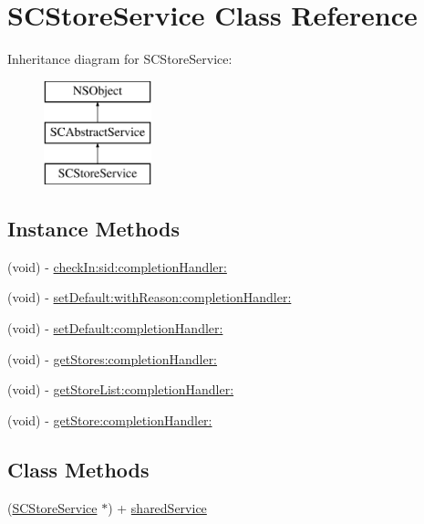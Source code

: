 \hypertarget{interface_s_c_store_service}{}\section{S\+C\+Store\+Service Class Reference}
\label{interface_s_c_store_service}
Inheritance diagram for S\+C\+Store\+Service\+:\begin{figure}[H]
\begin{center}
\leavevmode
\includegraphics[height=3.000000cm]{interface_s_c_store_service}
\end{center}
\end{figure}
\subsection*{Instance Methods}
\begin{DoxyCompactItemize}
\item 
(void) -\/ \hyperlink{interface_s_c_store_service_a6f5fcead65e857a0b706065e2ff3c822}{check\+In\+:sid\+:completion\+Handler\+:}
\item 
(void) -\/ \hyperlink{interface_s_c_store_service_a6961eb23220b17dd36f6a10e68032e41}{set\+Default\+:with\+Reason\+:completion\+Handler\+:}
\item 
(void) -\/ \hyperlink{interface_s_c_store_service_aac981e3e6158ccff5440cfe9d615831c}{set\+Default\+:completion\+Handler\+:}
\item 
(void) -\/ \hyperlink{interface_s_c_store_service_a7187d37ca52fa9c207580e7745e00b94}{get\+Stores\+:completion\+Handler\+:}
\item 
(void) -\/ \hyperlink{interface_s_c_store_service_a7901fdb6ddd8ed450c9e707f566aee2f}{get\+Store\+List\+:completion\+Handler\+:}
\item 
(void) -\/ \hyperlink{interface_s_c_store_service_a47b1a15ac76c7289a2d63b39f856ba40}{get\+Store\+:completion\+Handler\+:}
\end{DoxyCompactItemize}
\subsection*{Class Methods}
\begin{DoxyCompactItemize}
\item 
(\hyperlink{interface_s_c_store_service}{S\+C\+Store\+Service} $\ast$) + \hyperlink{interface_s_c_store_service_ab8cf26e8492fa6d5f8e942372a8cf467}{shared\+Service}
\end{DoxyCompactItemize}

